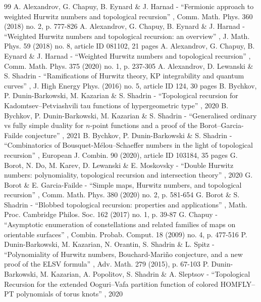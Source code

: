 \documentclass[11pt]{article}
\theoremstyle{plain}
\theoremstyle{definition}
\theoremstyle{remark}
\begin{document}

\begin{thebibliography}{99}
 A. Alexandrov, G. Chapuy, B. Eynard \& J. Harnad - “Fermionic approach to weighted Hurwitz numbers and topological recursion” , Comm. Math. Phys. 360 (2018) no. 2, p. 777-826
 A. Alexandrov, G. Chapuy, B. Eynard \& J. Harnad - “Weighted Hurwitz numbers and topological recursion: an overview” , J. Math. Phys. 59 (2018) no. 8, article ID 081102, 21 pages
 A. Alexandrov, G. Chapuy, B. Eynard \& J. Harnad - “Weighted Hurwitz numbers and topological recursion” , Comm. Math. Phys. 375 (2020) no. 1, p. 237-305
 A. Alexandrov, D. Lewanski \& S. Shadrin - “Ramifications of Hurwitz theory, KP integrability and quantum curves” , J. High Energy Phys. (2016) no. 5, article ID 124, 30 pages
 B. Bychkov, P. Dunin-Barkowski, M. Kazarian \& S. Shadrin - “Topological recursion for Kadomtsev–Petviashvili tau functions of hypergeometric type” , 2020
 B. Bychkov, P. Dunin-Barkowski, M. Kazarian \& S. Shadrin - “Generalised ordinary vs fully simple duality for $n$-point functions and a proof of the Borot–Garcia-Failde conjecture” , 2021
 B. Bychkov, P. Dunin-Barkowski \& S. Shadrin - “Combinatorics of Bousquet-Mélou–Schaeffer numbers in the light of topological recursion” , European J. Combin. 90 (2020), article ID 103184, 35 pages
 G. Borot, N. Do, M. Karev, D. Lewanski \& E. Moskovsky - “Double Hurwitz numbers: polynomiality, topological recursion and intersection theory” , 2020
 G. Borot \& E. Garcia-Failde - “Simple maps, Hurwitz numbers, and topological recursion” , Comm. Math. Phys. 380 (2020) no. 2, p. 581-654
 G. Borot \& S. Shadrin - “Blobbed topological recursion: properties and applications” , Math. Proc. Cambridge Philos. Soc. 162 (2017) no. 1, p. 39-87
 G. Chapuy - “Asymptotic enumeration of constellations and related families of maps on orientable surfaces” , Combin. Probab. Comput. 18 (2009) no. 4, p. 477-516
 P. Dunin-Barkowski, M. Kazarian, N. Orantin, S. Shadrin \& L. Spitz - “Polynomiality of Hurwitz numbers, Bouchard-Mariño conjecture, and a new proof of the ELSV formula” , Adv. Math. 279 (2015), p. 67-103
 P. Dunin-Barkowski, M. Kazarian, A. Popolitov, S. Shadrin \& A. Sleptsov - “Topological Recursion for the extended Ooguri–Vafa partition function of colored HOMFLY–PT polynomials of torus knots” , 2020

\end{thebibliography}
\end{document}
